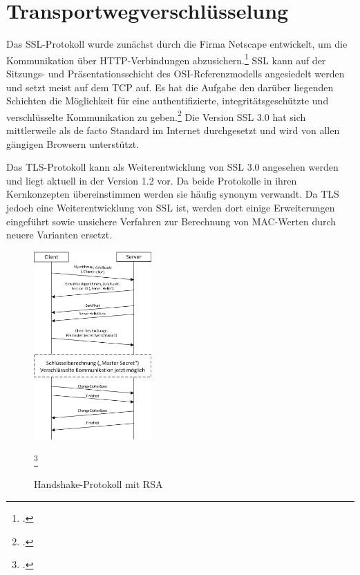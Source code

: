 \chapter{Transportwegverschlüsselung}
Das \ac{SSL}-Protokoll wurde zunächst durch die Firma Netscape entwickelt, um die Kommunikation über \ac{HTTP}-Verbindungen abzusichern.\footcite[S. 796]{Eckert2013} \ac{SSL} kann auf der Sitzungs- und Präsentationsschicht des \ac{OSI}-Referenzmodells angesiedelt werden und setzt meist auf dem \ac{TCP} auf. Es hat die Aufgabe den darüber liegenden Schichten die Möglichkeit für eine authentifizierte, integritätsgeschützte und verschlüsselte Kommunikation zu geben.\footcite[Vgl.][S. 799 ff.]{Eckert2013}
Die Version \ac{SSL} 3.0 hat sich mittlerweile als de facto Standard im Internet durchgesetzt und wird von allen gängigen Browsern unterstützt.

Das \ac{TLS}-Protokoll kann als Weiterentwicklung von \ac{SSL} 3.0 angesehen werden und liegt aktuell in der Version 1.2 vor.
Da beide Protokolle in ihren Kernkonzepten übereinstimmen werden sie häufig synonym verwandt. Da \ac{TLS} jedoch eine Weiterentwicklung von \ac{SSL} ist, werden dort einige Erweiterungen eingeführt sowie unsichere Verfahren zur Berechnung von \ac{MAC}-Werten durch neuere Varianten ersetzt.\\
\begin{figure}
	\begin{center}
		\includegraphics[width=0.4\textwidth]{images/MSC_Transport.png}
	\end{center}
	\caption{Handshake-Protokoll mit RSA}
	\footcite[In Anlehnung an][S. 170]{Sorge2013}
	\label{MSC_Transport}
\end{figure}

